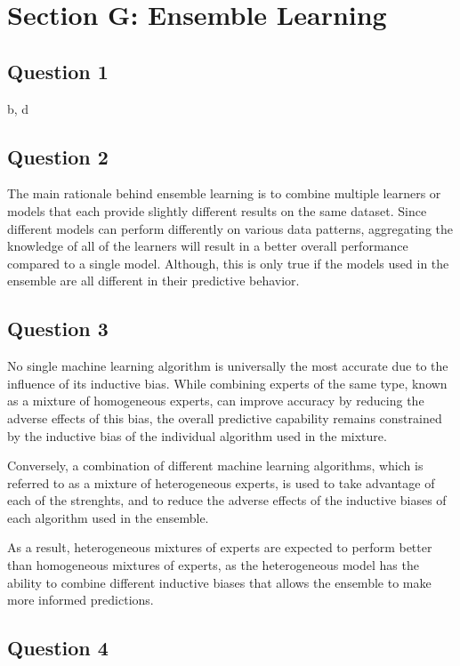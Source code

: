 \documentclass[10pt]{article}
\begin{document}
\section*{Section G: Ensemble Learning}

\subsection*{Question 1}

b, d

\subsection*{Question 2}

The main rationale behind ensemble learning is to combine multiple learners or models that each provide slightly
different results on the same dataset. Since different models can perform differently on various data patterns,
aggregating the knowledge of all of the learners will result in a better overall performance compared to a
single model. Although, this is only true if the models used in the ensemble are all different in their predictive behavior.

\subsection*{Question 3}

No single machine learning algorithm is universally the most accurate due to the influence of its inductive bias.
While combining experts of the same type, known as a mixture of homogeneous experts, can improve accuracy by reducing
the adverse effects of this bias, the overall predictive capability remains constrained by the inductive bias of the
individual algorithm used in the mixture.

Conversely, a combination of different machine learning algorithms, which is referred to as a mixture of heterogeneous experts,
is used to take advantage of each of the strenghts, and to reduce the adverse effects of the inductive
biases of each algorithm used in the ensemble.

As a result, heterogeneous mixtures of experts are expected to perform better than homogeneous mixtures
of experts, as the heterogeneous model has the ability to combine different inductive biases that allows the
ensemble to make more informed predictions.

\subsection*{Question 4}
\end{document}
